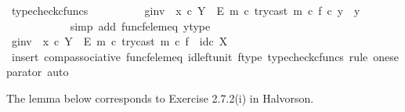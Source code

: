 \begin{isabellebody}
\ typecheck{\isacharunderscore}{\kern0pt}cfuncs\isanewline
\isanewline
\ \ \ \ \ \ \ \ \isamarkupfalse%
\ {\isachardoublequoteopen}{\isacharparenleft}{\kern0pt}g{\isacharunderscore}{\kern0pt}inv\ {\isasymamalg}\ {\isacharparenleft}{\kern0pt}x\ {\isasymcirc}\isactrlsub c\ {\isasymbeta}\isactrlbsub Y\ {\isasymsetminus}\ {\isacharparenleft}{\kern0pt}E{\isacharcomma}{\kern0pt}\ m{\isacharparenright}{\kern0pt}\isactrlesub {\isacharparenright}{\kern0pt}\ {\isasymcirc}\isactrlsub c\ try{\isacharunderscore}{\kern0pt}cast\ m{\isacharparenright}{\kern0pt}\ {\isasymcirc}\isactrlsub c\ f\ {\isasymcirc}\isactrlsub c\ y\ {\isacharequal}{\kern0pt}\ y{\isachardoublequoteclose}\isanewline
\ \ \ \ \ \ \ \ \ \ \isamarkupfalse%
\ {\isacharparenleft}{\kern0pt}simp\ add{\isacharcolon}{\kern0pt}\ func{\isacharunderscore}{\kern0pt}f{\isacharunderscore}{\kern0pt}elem{\isacharunderscore}{\kern0pt}eq\ y{\isacharunderscore}{\kern0pt}type{\isacharparenright}{\kern0pt}\isanewline
\ \ \ \ \ \ \isamarkupfalse%
\isanewline
\ \ \ \ \isamarkupfalse%
\isanewline
\isanewline
\ \ \ \ \isamarkupfalse%
\ {\isachardoublequoteopen}{\isacharparenleft}{\kern0pt}g{\isacharunderscore}{\kern0pt}inv\ {\isasymamalg}\ {\isacharparenleft}{\kern0pt}x\ {\isasymcirc}\isactrlsub c\ {\isasymbeta}\isactrlbsub Y\ {\isasymsetminus}\ {\isacharparenleft}{\kern0pt}E{\isacharcomma}{\kern0pt}\ m{\isacharparenright}{\kern0pt}\isactrlesub {\isacharparenright}{\kern0pt}\ {\isasymcirc}\isactrlsub c\ try{\isacharunderscore}{\kern0pt}cast\ m{\isacharparenright}{\kern0pt}\ {\isasymcirc}\isactrlsub c\ f\ {\isacharequal}{\kern0pt}\ id\isactrlsub c\ X{\isachardoublequoteclose}\isanewline
\ \ \ \ \ \ \isamarkupfalse%
\ {\isacharparenleft}{\kern0pt}insert\ comp{\isacharunderscore}{\kern0pt}associative{}\ func{\isacharunderscore}{\kern0pt}f{\isacharunderscore}{\kern0pt}elem{\isacharunderscore}{\kern0pt}eq\ id{\isacharunderscore}{\kern0pt}left{\isacharunderscore}{\kern0pt}unit{}\ f{\isacharunderscore}{\kern0pt}type{\isacharcomma}{\kern0pt}\ typecheck{\isacharunderscore}{\kern0pt}cfuncs{\isacharcomma}{\kern0pt}\ rule\ one{\isacharunderscore}{\kern0pt}separator{\isacharcomma}{\kern0pt}\ auto{\isacharparenright}{\kern0pt}\isanewline
\ \ \isamarkupfalse%
\isanewline
{}\isamarkupfalse%
%
\endisatagproof
{\isafoldproof}%
%
\isadelimproof
%
\endisadelimproof
%
\begin{isamarkuptext}%
The lemma below corresponds to Exercise 2.7.2(i) in Halvorson.%
\end{isamarkuptext}\isamarkuptrue%

\end{isabellebody}
